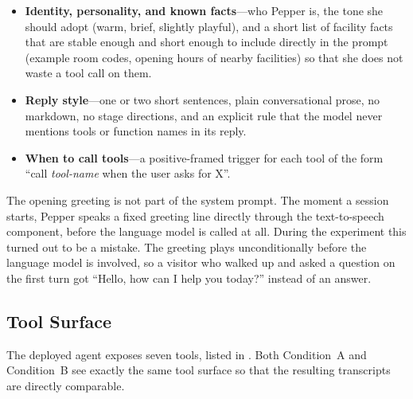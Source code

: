 \begin{itemize}
    \item \textbf{Identity, personality, and known facts}---who Pepper is, the tone she should adopt (warm, brief, slightly playful), and a short list of facility facts that are stable enough and short enough to include directly in the prompt (example room codes, opening hours of nearby facilities) so that she does not waste a tool call on them.
    \item \textbf{Reply style}---one or two short sentences, plain conversational prose, no markdown, no stage directions, and an explicit rule that the model never mentions tools or function names in its reply.
    \item \textbf{When to call tools}---a positive-framed trigger for each tool of the form ``call \emph{tool-name} when the user asks for X''.
\end{itemize}

The opening greeting is not part of the system prompt.
The moment a session starts, Pepper speaks a fixed greeting line directly through the text-to-speech component, before the language model is called at all.
During the experiment this turned out to be a mistake. The greeting plays unconditionally before the language model is involved, so a visitor who walked up and asked a question on the first turn got ``Hello, how can I help you today?'' instead of an answer.

\subsection{Tool Surface}
\label{sec:tool_surface}

The deployed agent exposes seven tools, listed in .
Both Condition~A and Condition~B see exactly the same tool surface so that the resulting transcripts are directly comparable.

